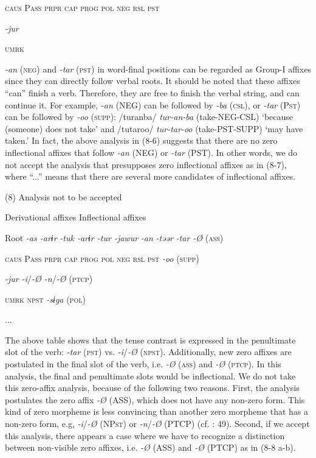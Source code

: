       \textsc{caus}  P\textsc{ass}  \textsc{prpr}  \textsc{cap}  \textsc{prog}  \textsc{pol}  \textsc{neg}  \textsc{rsl}  \textsc{pst}

            \textit{{}-jur} 

            \textsc{umrk}

\textit{{}-an} (\textsc{neg}) and \textit{{}-tar} (\textsc{pst}) in word-final positions can be regarded as Group-I affixes since they can directly follow verbal roots. It should be noted that these affixes “can” finish a verb. Therefore, they are free to finish the verbal string, and can continue it. For example, \textit{{}-an} (NEG) can be followed by \textit{{}-ba} (\textsc{csl}), or \textit{{}-tar} (P\textsc{st}) can be followed by \textit{{}-oo} (\textsc{supp}): /turanba/ \textit{tur-an-ba} (take-NEG-CSL) ‘because (someone) does not take’ and /tutaroo/ \textit{tur-tar-oo} (take-PST-SUPP) ‘may have taken.’ In fact, the above analysis in (8-6) suggests that there are no zero inflectional affixes that follow \textit{{}-an} (NEG) or \textit{{}-tar} (PST). In other words, we do not accept the analysis that presupposes zero inflectional affixes as in (8-7), where “...” means that there are several more candidates of inflectional affixes.

(8)  Analysis not to be accepted

    Derivational affixes  Inflectional affixes

  Root  \textit{{}-as  {}-arɨr} %
\textit{{}-tuk  {}-arɨr  {}-tur  {}-jawur} %
\textit{{}-an} %
\textit{{}-təər} %
\textit{{}-tar  {}-Ø} (\textsc{ass})

    \textsc{caus}  P\textsc{ass}  \textsc{prpr}  \textsc{cap}  \textsc{prog}  \textsc{pol}  \textsc{neg}  \textsc{rsl}  \textsc{pst}  \textit{{}-oo} (\textsc{supp})

          \textit{{}-jur    {}-i}/\textit{{}-Ø  {}-n}/\textit{{}-Ø} (\textsc{ptcp})

          \textsc{umrk}    \textsc{npst}  \textit{{}-sɨga} (\textsc{pol})

                ...

The above table shows that the tense contrast is expressed in the penultimate slot of the verb: \textit{{}-tar} (\textsc{pst}) vs. \textit{{}-i}/\textit{{}-Ø} (\textsc{npst}). Additionally, new zero affixes are postulated in the final slot of the verb, i.e. \textit{{}-Ø} (\textsc{ass}) and \textit{{}-Ø} (\textsc{ptcp}). In this analysis, the final and penultimate slots would be inflectional. We do not take this zero-affix analysis, because of the following two reasons. First, the analysis postulates the zero affix \textit{{}-Ø} (ASS), which does not have any non-zero form. This kind of zero morpheme is less convincing than another zero morpheme that has a non-zero form, e.g, \textit{{}-i}/\textit{{}-Ø} (NP\textsc{st}) or \textit{{}-n}/\textit{{}-Ø} (PTCP) (cf. \citealt{Haas1974}: 49). Second, if we accept this analysis, there appears a case where we have to recognize a distinction between non-visible zero affixes, i.e. \textit{{}-Ø} (ASS) and \textit{{}-Ø} (PTCP) as in (8-8 a-b).

